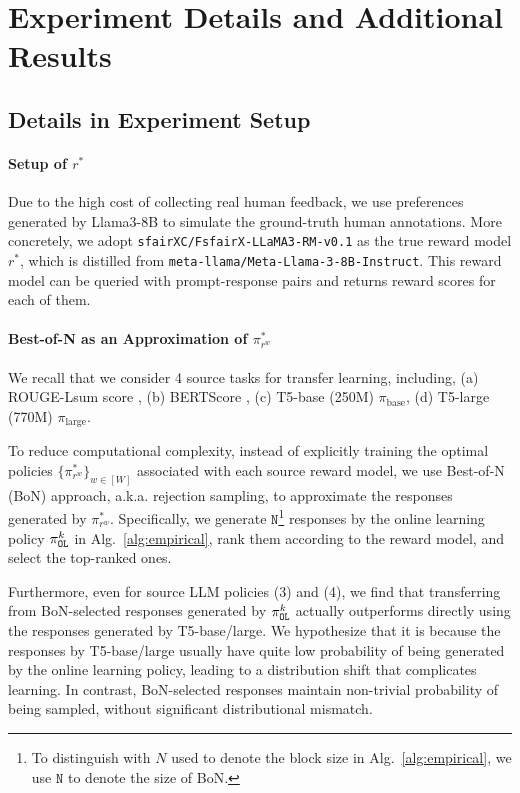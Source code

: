 \section{Experiment Details and Additional Results}\label{appx:experiment}

\subsection{Details in Experiment Setup}
\paragraph{Setup of $r^*$}
Due to the high cost of collecting real human feedback, we use preferences generated by Llama3-8B \citep{dubey2024llama} to simulate the ground-truth human annotations.
More concretely, we adopt \texttt{sfairXC/FsfairX-LLaMA3-RM-v0.1} \citep{dong2405rlhf} as the true reward model $r^*$, which is distilled from \texttt{meta-llama/Meta-Llama-3-8B-Instruct}.
This reward model can be queried with prompt-response pairs and returns reward scores for each of them.


\paragraph{Best-of-N as an Approximation of $\pi^*_{r^w}$}
We recall that we consider 4 source tasks for transfer learning, including, (a) ROUGE-Lsum score \citep{lin2004rouge}, (b) BERTScore \citep{zhang2019bertscore}, (c) T5-base (250M) $\pi_{\text{base}}$, (d) T5-large (770M) $\pi_{\text{large}}$.

To reduce computational complexity, instead of explicitly training the optimal policies $\{\pi^*_{r^w}\}_{w\in[W]}$ associated with each source reward model, we use Best-of-N (BoN) approach, a.k.a. rejection sampling, to approximate the responses generated by $\pi^*_{r^w}$.
Specifically, we generate $\texttt{N}$\footnote{To distinguish with $N$ used to denote the block size in Alg.~\ref{alg:empirical}, we use $\texttt{N}$ to denote the size of BoN.} responses by the online learning policy $\pi^k_{\texttt{OL}}$ in Alg.~\ref{alg:empirical}, rank them according to the reward model, and select the top-ranked ones.

Furthermore, even for source LLM policies (3) and (4), we find that transferring from BoN-selected responses generated by $\pi^k_{\texttt{OL}}$ actually outperforms directly using the responses generated by T5-base/large.
We hypothesize that it is because the responses by T5-base/large usually have quite low probability of being generated by the online learning policy, leading to a distribution shift that complicates learning.
In contrast, BoN-selected responses maintain non-trivial probability of being sampled, without significant distributional mismatch.

